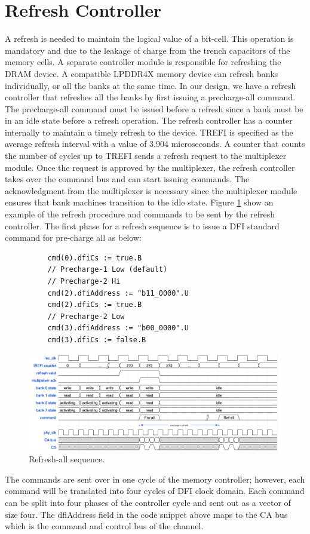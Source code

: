 \section{Refresh Controller}
A refresh is needed to maintain the logical value of a bit-cell. This operation is mandatory and due to the leakage of charge from the trench capacitors of the memory cells. A separate controller module is responsible for refreshing the DRAM device. A compatible LPDDR4X memory device can refresh banks individually, or all the banks at the same time. In our design, we have a refresh controller that refreshes all the banks by first issuing a precharge-all command. The precharge-all command must be issued before a refresh since a bank must be in an idle state before a refresh operation. The refresh controller has a counter internally to maintain a timely refresh to the device. TREFI is specified as the average refresh interval with a value of 3.904 microseconds. A counter that counts the number of cycles up to TREFI sends a refresh request to the multiplexer module. Once the request is approved by the multiplexer, the refresh controller takes over the command bus and can start issuing commands. The acknowledgment from the multiplexer is necessary since the multiplexer module ensures that bank machines transition to the idle state. Figure \ref{fig:refall} show an example of the refresh procedure and commands to be sent by the refresh controller. 
\newpage
The first phase for a refresh sequence is to issue a DFI standard command for pre-charge all as below:
\begin{verbatim}
          cmd(0).dfiCs := true.B
          // Precharge-1 Low (default)
          // Precharge-2 Hi
          cmd(2).dfiAddress := "b11_0000".U
          cmd(2).dfiCs := true.B
          // Precharge-2 Low
          cmd(3).dfiAddress := "b00_0000".U
          cmd(3).dfiCs := false.B
\end{verbatim}
\begin{figure}
    \centering
    \includegraphics[scale=0.5]{images/refresh-wave.png}
    \caption{Refresh-all sequence.}
    \label{fig:refall}
\end{figure}
The commands are sent over in one cycle of the memory controller; however, each command will be translated into four cycles of DFI clock domain. Each command can be split into four phases of the controller cycle and sent out as a vector of size four. The dfiAddress field in the code snippet above maps to the CA bus which is the command and control bus of the channel. 
